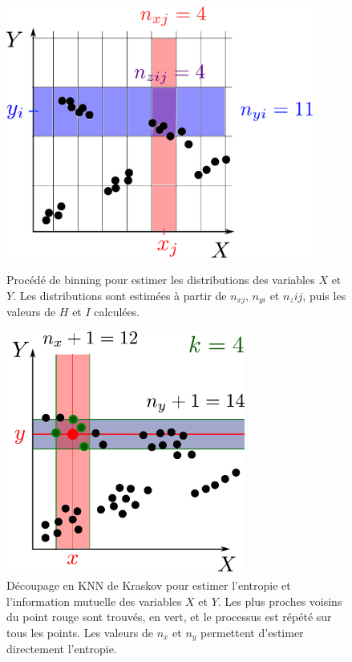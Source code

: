 \begin{figure}
\begin{minipage}{0.45\textwidth}
\centering
\includegraphics[width=0.9\textwidth]{boxes}
\caption{Procédé de binning pour estimer les distributions des variables $X$ et $Y$. Les distributions sont estimées à partir de $n_{xj}$, $n_{yi}$ et $n_z{ij}$, puis les valeurs de $H$ et $I$ calculées.}
\label{fig:binning} 
\end{minipage}
\hfill
\begin{minipage}{0.45\textwidth}
\centering
\includegraphics[width=0.7\textwidth]{kraskov}
\caption{Découpage en KNN de Kraskov pour estimer l'entropie et l'information mutuelle des variables $X$ et $Y$. Les plus proches voisins du point rouge sont trouvés, en vert, et le processus est répété sur tous les points. Les valeurs de $n_x$ et $n_y$ permettent d'estimer directement l'entropie.}
\label{fig:kraskov}
\end{minipage}
\end{figure}

